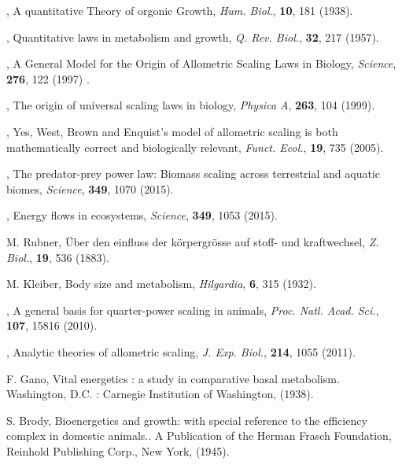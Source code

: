 \documentclass[10pt]{iopart}
\begin{document}
%
\begin{thebibliography}{100}

, {A quantitative Theory of orgonic Growth}, \textit{Hum. Biol.}, \textbf{10}, {181} {(1938)}.

, {Quantitative laws in metabolism and growth}, \textit{Q. Rev. Biol.}, \textbf{32}, {217} {(1957)}.

, {A General Model for the Origin of Allometric Scaling Laws in Biology}, \textit{Science}, \textbf{276}, {122} {(1997)} .

, { The origin of universal scaling laws in biology}, \textit{Physica A}, \textbf{263}, {104} {(1999)}.

, {Yes, West, Brown and Enquist's model of allometric scaling is both mathematically correct and biologically relevant}, \textit{Funct. Ecol.}, \textbf{19}, 735 {(2005)}.

, {The predator-prey power law: Biomass scaling across terrestrial and aquatic biomes}, \textit{Science}, \textbf{349}, {1070} {(2015)}.

, {Energy flows in ecosystems}, \textit{Science}, \textbf{349},  {1053} {(2015)}.

 M. Rubner, {{\"{U}}ber den einfluss der k{\"{o}}rpergr{\"{o}}sse auf stoff- und kraftwechsel}, \textit{Z. Biol.}, \textbf{19},  536 (1883).

 M. Kleiber, {Body size and metabolism}, \textit{Hilgardia}, \textbf{6}, 315 (1932).

, {A general basis for quarter-power scaling in animals}, \textit{Proc. Natl. Acad. Sci.}, \textbf{107}, {15816} {(2010)}.

, {Analytic theories of allometric scaling}, \textit{J. Exp. Biol.}, \textbf{214}, 1055 {(2011)}.

 {F. Gano}, {Vital energetics : a study in comparative basal metabolism}. {Washington, D.C. : Carnegie Institution of Washington}, {(1938)}.

 S. Brody, {Bioenergetics and growth: with special reference to the efficiency complex in domestic animals.}. A Publication of the Herman Frasch Foundation, Reinhold Publishing Corp., New York, (1945).


\end{thebibliography}
\end{document}
